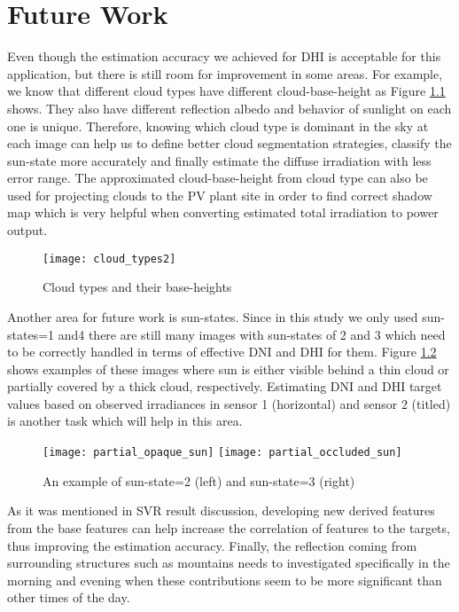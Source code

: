 \chapter{Future Work}
\label{sec:future_work_chapter}
Even though the estimation accuracy we achieved for DHI is acceptable for this application, but there is still room for improvement in some areas. For example, 
we know that different cloud types have different cloud-base-height as Figure \ref{fig:cloud_type} shows. They also have different reflection albedo and behavior of sunlight on each one is unique. Therefore, knowing which cloud type is dominant in the sky at each image can help us to define better cloud segmentation strategies, classify the sun-state more accurately and finally estimate the diffuse irradiation with less error range. The approximated cloud-base-height from cloud type can also be used for projecting clouds to the PV plant site in order to find correct shadow map which is very helpful when converting estimated total irradiation to power output.

\begin{figure}[h!]
\caption{Cloud types and their base-heights}
\label{fig:cloud_type}
\texttt{[image: cloud\_types2]}
\centering
\end{figure}

Another area for future work is sun-states. Since in this study we only used sun-states=1 and4 there are still many images with sun-states of 2 and 3 which need to be correctly handled in terms of effective DNI and DHI for them. Figure \ref{fig:img_state_2} shows examples of these images where sun is either visible behind a thin cloud or partially covered by a thick cloud, respectively. Estimating DNI and DHI target values based on observed irradiances in sensor 1 (horizontal) and sensor 2 (titled) is another task which will help in this area.

\begin{figure}[h!]
\caption{An example of sun-state=2 (left) and sun-state=3 (right)}
\label{fig:img_state_2}
\texttt{[image: partial\_opaque\_sun]}
\texttt{[image: partial\_occluded\_sun]}
\centering
\end{figure}

As it was mentioned in SVR result discussion, developing new derived features from the base features can help increase the correlation of features to the targets, thus improving the estimation accuracy. Finally, the reflection coming from surrounding structures such as mountains needs to investigated specifically in the morning and evening when these contributions seem to be more significant than other times of the day.
